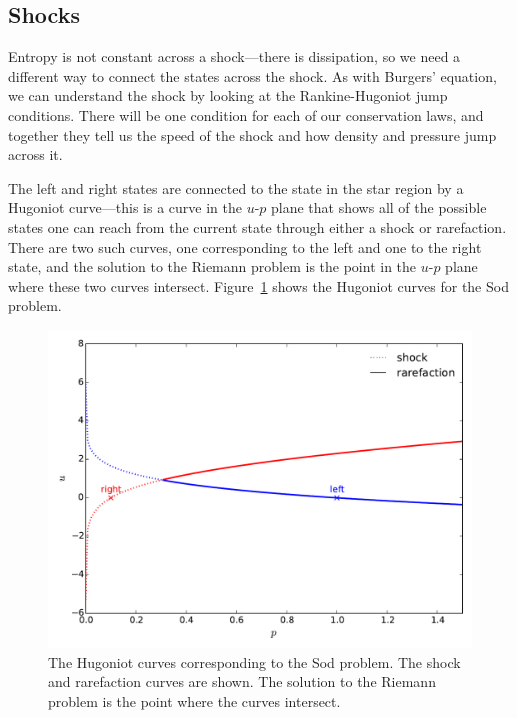 \subsection{Shocks}

Entropy is not constant across a shock---there is dissipation, so we
need a different way to connect the states across the shock.  As with
Burgers' equation, we can understand the shock by looking at the
Rankine-Hugoniot jump conditions.  There will be one condition for
each of our conservation laws, and together they tell us the speed of
the shock and how density and pressure jump across
it.  

The left and right states are connected to the state in the star
region by a Hugoniot curve---this is a curve in the $u$-$p$ plane that
shows all of the possible states one can reach from the current state
through either a shock or rarefaction.  There are two such curves, one
corresponding to the left and one to the right state, and the solution
to the Riemann problem is the point in the $u$-$p$ plane where these
two curves intersect.  Figure~\ref{fig:euler:riemann-curve} shows the
Hugoniot curves for the Sod problem.

\begin{figure}[t]
\centering
\includegraphics[width=0.9\linewidth]{riemann-phase}
\caption[The Hugoniot curves corresponding
to the Sod problem]{\label{fig:euler:riemann-curve} The Hugoniot
curves corresponding to the Sod problem.  The shock and rarefaction
curves are shown.  The solution to the Riemann problem is the point
where the curves intersect.\\
}
\end{figure}





